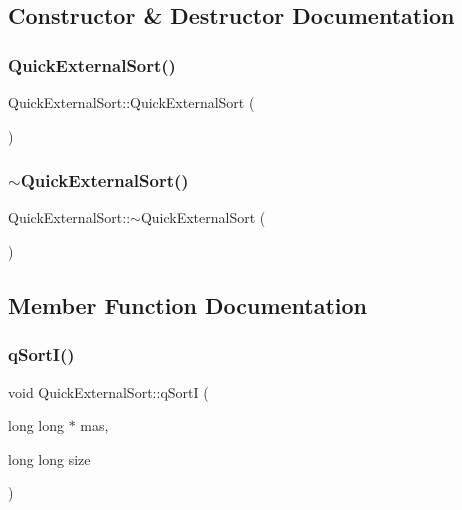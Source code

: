 \subsection{Constructor \& Destructor Documentation}
\hypertarget{class_quick_external_sort_ac31914e67af41c48b8fdcbcc076168ed}{}\label{class_quick_external_sort_ac31914e67af41c48b8fdcbcc076168ed} 
\subsubsection{\texorpdfstring{Quick\+External\+Sort()}{QuickExternalSort()}}
{\footnotesize\ttfamily Quick\+External\+Sort\+::\+Quick\+External\+Sort (\begin{DoxyParamCaption}{ }\end{DoxyParamCaption})}

\hypertarget{class_quick_external_sort_a370e2be5e7c4afc31f9b230c2ee4d689}{}\label{class_quick_external_sort_a370e2be5e7c4afc31f9b230c2ee4d689} 
\subsubsection{\texorpdfstring{$\sim$\+Quick\+External\+Sort()}{~QuickExternalSort()}}
{\footnotesize\ttfamily Quick\+External\+Sort\+::$\sim$\+Quick\+External\+Sort (\begin{DoxyParamCaption}{ }\end{DoxyParamCaption})}



\subsection{Member Function Documentation}
\hypertarget{class_quick_external_sort_a912abb7f2ccdadd7d97992f035e16183}{}\label{class_quick_external_sort_a912abb7f2ccdadd7d97992f035e16183} 
\subsubsection{\texorpdfstring{q\+Sort\+I()}{qSortI()}}
{\footnotesize\ttfamily void Quick\+External\+Sort\+::q\+SortI (\begin{DoxyParamCaption}\item[{long long $\ast$}]{mas,  }\item[{long long}]{size }\end{DoxyParamCaption})\hspace{0.3cm}{\ttfamily [private]}}

